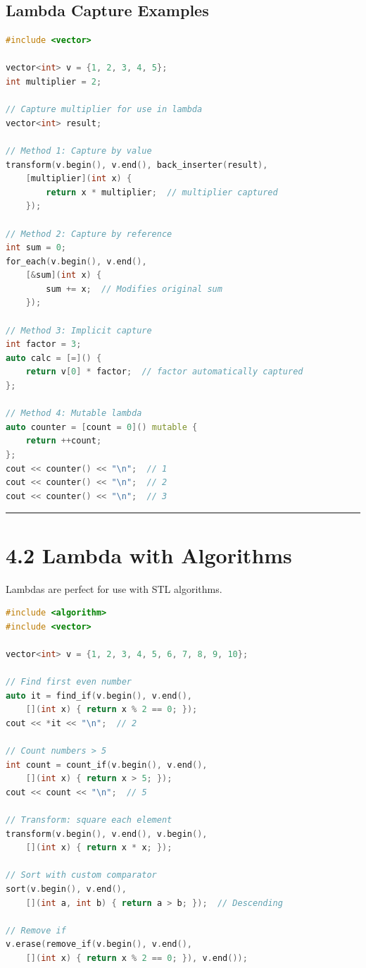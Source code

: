 \hypertarget{lambda-capture-examples}{%
\subsection{Lambda Capture Examples}\label{lambda-capture-examples}}

\begin{lstlisting}[language={C++}]
#include <vector>

vector<int> v = {1, 2, 3, 4, 5};
int multiplier = 2;

// Capture multiplier for use in lambda
vector<int> result;

// Method 1: Capture by value
transform(v.begin(), v.end(), back_inserter(result),
    [multiplier](int x) {
        return x * multiplier;  // multiplier captured
    });

// Method 2: Capture by reference
int sum = 0;
for_each(v.begin(), v.end(),
    [&sum](int x) {
        sum += x;  // Modifies original sum
    });

// Method 3: Implicit capture
int factor = 3;
auto calc = [=]() {
    return v[0] * factor;  // factor automatically captured
};

// Method 4: Mutable lambda
auto counter = [count = 0]() mutable {
    return ++count;
};
cout << counter() << "\n";  // 1
cout << counter() << "\n";  // 2
cout << counter() << "\n";  // 3
\end{lstlisting}

\begin{center}\rule{0.5\linewidth}{0.5pt}\end{center}

\hypertarget{lambda-with-algorithms}{%
\section{4.2 Lambda with Algorithms}\label{lambda-with-algorithms}}

Lambdas are perfect for use with STL algorithms.

\begin{lstlisting}[language={C++}]
#include <algorithm>
#include <vector>

vector<int> v = {1, 2, 3, 4, 5, 6, 7, 8, 9, 10};

// Find first even number
auto it = find_if(v.begin(), v.end(),
    [](int x) { return x % 2 == 0; });
cout << *it << "\n";  // 2

// Count numbers > 5
int count = count_if(v.begin(), v.end(),
    [](int x) { return x > 5; });
cout << count << "\n";  // 5

// Transform: square each element
transform(v.begin(), v.end(), v.begin(),
    [](int x) { return x * x; });

// Sort with custom comparator
sort(v.begin(), v.end(),
    [](int a, int b) { return a > b; });  // Descending

// Remove if
v.erase(remove_if(v.begin(), v.end(),
    [](int x) { return x % 2 == 0; }), v.end());
\end{lstlisting}

